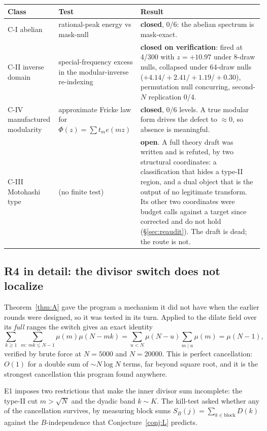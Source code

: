 \documentclass[11pt,a4paper]{article}
\theoremstyle{plain}
\theoremstyle{definition}
\begin{document}
\begin{longtable}{p{}p{}p{}}
\hline
Class & Test & Result\\
\hline
\endhead
C-I abelian & rational-peak energy vs mask-null &
 \textbf{closed}, 0/6: the abelian spectrum is mask-exact.\\
C-II inverse domain & special-frequency excess in the
 modular-inverse re-indexing &
 \textbf{closed on verification}: fired at 4/300 with $z = +10.97$
 under 8-draw nulls, collapsed under 64-draw nulls
 ($+4.14/+2.41/+1.19/+0.30$), permutation null concurring, second-$N$
 replication 0/4.\\
C-IV manufactured modularity & approximate Fricke law for
 $\Phi(z) = \sum t_m e(mz)$ &
 \textbf{closed}, 0/6 levels. A true modular form drives the defect to
 $\approx 0$, so absence is meaningful.\\
C-III Motohashi type & (no finite test) &
 \textbf{open}. A full theory draft was written and is refuted, by two
 structural coordinates: a classification that hides a type-II region,
 and a dual object that is the output of no legitimate transform. Its
 other two coordinates were budget calls against a target since
 corrected and do not hold (\S\ref{sec:reaudit}). The draft is dead;
 the route is not.\\
\hline
\end{longtable}

\subsection{R4 in detail: the divisor switch does not
localize}\label{sec:R4}

Theorem~\ref{thm:A} gave the program a mechanism it did not have when
the earlier rounds were designed, so it was tested in its turn.
Applied to the dilate field over its \emph{full} ranges the switch
gives an exact identity
\[
  \sum_{k\ge1}\ \sum_{m:\,mk\le N-1}\mu(m)\mu(N-mk)
  = \sum_{u<N}\mu(N-u)\sum_{m\mid u}\mu(m)
  = \mu(N-1),
\]
verified by brute force at $N = 5000$ and $N = 20000$. This is perfect
cancellation: $O(1)$ for a double sum of $\sim N\log N$ terms, far
beyond square root, and it is the strongest cancellation this program
found anywhere.

E1 imposes two restrictions that make the inner divisor sum
incomplete: the type-II cut $m > \sqrt N$ and the dyadic band
$k \sim K$. The kill-test asked whether any of the cancellation
survives, by measuring block sums $S_B(j) = \sum_{k\in\text{block}}D(k)$
against the $B$-independence that Conjecture~\ref{conj:L} predicts.
\end{document}
